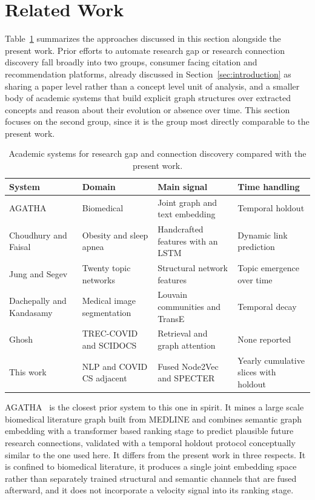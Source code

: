\documentclass{ieeeaccess}
\begin{document}
\section{Related Work}
\label{sec:relatedwork}

Table~\ref{tab:relatedwork} summarizes the approaches discussed in this section alongside the present work. Prior efforts to automate research gap or research connection discovery fall broadly into two groups, consumer facing citation and recommendation platforms, already discussed in Section~\ref{sec:introduction} as sharing a paper level rather than a concept level unit of analysis, and a smaller body of academic systems that build explicit graph structures over extracted concepts and reason about their evolution or absence over time. This section focuses on the second group, since it is the group most directly comparable to the present work.

\begin{table}[t]
\caption{Academic systems for research gap and connection discovery compared with the present work.}
\label{tab:relatedwork}
\footnotesize
\setlength{\tabcolsep}{3pt}
\begin{tabular}{p{}p{}p{}p{}}
\toprule
System & Domain & Main signal & Time handling \\
\midrule
AGATHA~\cite{sybrandt2020agatha} & Biomedical & Joint graph and text embedding & Temporal holdout \\
Choudhury and Faisal~\cite{choudhury2019miningtemporalevolutionknowledge} & Obesity and sleep apnea & Handcrafted features with an LSTM & Dynamic link prediction \\
Jung and Segev~\cite{jung2022generalizability} & Twenty topic networks & Structural network features & Topic emergence over time \\
Dachepally and Kandasamy~\cite{dachepally2026} & Medical image segmentation & Louvain communities and TransE & Temporal decay \\
Ghosh~\cite{ghosh2026researchrag} & TREC-COVID and SCIDOCS & Retrieval and graph attention & None reported \\
This work & NLP and COVID CS adjacent & Fused Node2Vec and SPECTER & Yearly cumulative slices with holdout \\
\bottomrule
\end{tabular}
\end{table}

AGATHA~\cite{sybrandt2020agatha} is the closest prior system to this one in spirit. It mines a large scale biomedical literature graph built from MEDLINE and combines semantic graph embedding with a transformer based ranking stage to predict plausible future research connections, validated with a temporal holdout protocol conceptually similar to the one used here. It differs from the present work in three respects. It is confined to biomedical literature, it produces a single joint embedding space rather than separately trained structural and semantic channels that are fused afterward, and it does not incorporate a velocity signal into its ranking stage.
\end{document}
